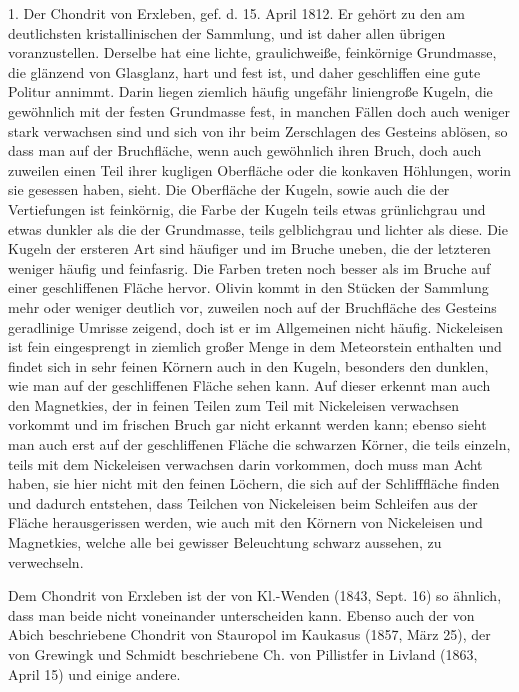 \documentclass[a4paper, 11pt, oneside]{article}
\begin{document}
1. Der Chondrit von Erxleben, gef. d. 15. April 1812. Er gehört zu den am deutlichsten kristallinischen der Sammlung, und ist daher allen übrigen voranzustellen. Derselbe hat eine lichte, graulichweiße, feinkörnige Grundmasse, die glänzend von Glasglanz, hart und fest ist, und daher geschliffen eine gute Politur annimmt. Darin liegen ziemlich häufig ungefähr liniengroße Kugeln, die gewöhnlich mit der festen Grundmasse fest, in manchen Fällen doch auch weniger stark verwachsen sind und sich von ihr beim Zerschlagen des Gesteins ablösen, so dass man auf der Bruchfläche, wenn auch gewöhnlich ihren Bruch, doch auch zuweilen einen Teil ihrer kugligen Oberfläche oder die konkaven Höhlungen, worin sie gesessen haben, sieht. Die Oberfläche der Kugeln, sowie auch die der Vertiefungen ist feinkörnig, die Farbe der Kugeln teils etwas grünlichgrau und etwas dunkler als die der Grundmasse, teils gelblichgrau und lichter als diese. Die Kugeln der ersteren Art sind häufiger und im Bruche uneben, die der letzteren weniger häufig und feinfasrig. Die Farben treten noch besser als im Bruche auf einer geschliffenen Fläche hervor. Olivin kommt in den Stücken der Sammlung mehr oder weniger deutlich vor, zuweilen noch auf der Bruchfläche des Gesteins geradlinige Umrisse zeigend, doch ist er im Allgemeinen nicht häufig. Nickeleisen ist fein eingesprengt in ziemlich großer Menge in dem Meteorstein enthalten und findet sich in sehr feinen Körnern auch in den Kugeln, besonders den dunklen, wie man auf der geschliffenen Fläche sehen kann. Auf dieser erkennt man auch den Magnetkies, der in feinen Teilen zum Teil mit Nickeleisen verwachsen vorkommt und im frischen Bruch gar nicht erkannt werden kann; ebenso sieht man auch erst auf der geschliffenen Fläche die schwarzen Körner, die teils einzeln, teils mit dem Nickeleisen verwachsen darin vorkommen, doch muss man Acht haben, sie hier nicht mit den feinen Löchern, die sich auf der Schlifffläche finden und dadurch entstehen, dass Teilchen von Nickeleisen beim Schleifen aus der Fläche herausgerissen werden, wie auch mit den Körnern von Nickeleisen und Magnetkies, welche alle bei gewisser Beleuchtung schwarz aussehen, zu verwechseln.

Dem Chondrit von Erxleben ist der von Kl.-Wenden (1843, Sept. 16) so ähnlich, dass man beide nicht voneinander unterscheiden kann. Ebenso auch der von Abich beschriebene Chondrit von Stauropol im Kaukasus (1857, März 25), der von Grewingk und Schmidt beschriebene Ch. von Pillistfer in Livland (1863, April 15) und einige andere.
\end{document}
